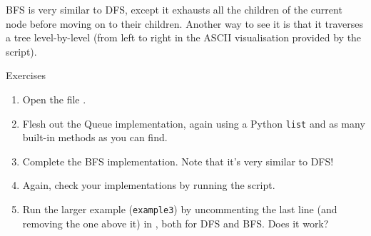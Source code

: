 BFS is very similar to DFS, except it exhausts all the children of the current node before moving on to their children. Another way to see it is that it traverses a tree level-by-level (from left to right in the ASCII visualisation provided by the script).
%
\begin{mybox}{Exercises}
    \begin{enumerate}
        \item Open the file .
        \item Flesh out the Queue implementation, again using a Python \texttt{list} and as many built-in methods as you can find.
        \item Complete the BFS implementation. Note that it's very similar to DFS!
        \item Again, check your implementations by running the script.
        \item Run the larger example (\texttt{example3}) by uncommenting the last line (and removing the one above it) in , both for DFS and BFS. Does it work?
    \end{enumerate}
\end{mybox}

